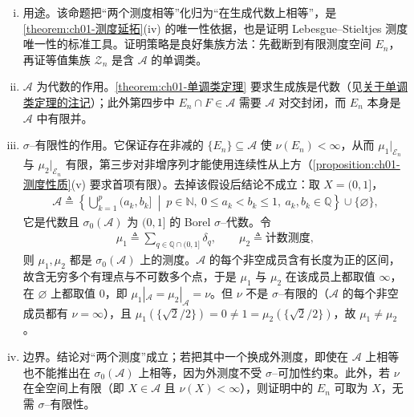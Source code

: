 \documentclass[../../main.tex]{subfiles}%
\begin{document}
\begin{remark}\label{remark:ch01-重合准则}
\begin{enumerate}[(i)]
\item 用途。该命题把“两个测度相等”化归为“在生成代数上相等”，是\cref{theorem:ch01-测度延拓}(iv) 的唯一性依据，也是证明 Lebesgue--Stieltjes 测度唯一性的标准工具。证明策略是良好集族方法：先截断到有限测度空间 $E_n$，再证等值集族 $\mathcal{Z}_n$ 是含 $\mathcal{A}$ 的单调类。
\item $\mathcal{A}$ 为代数的作用。\cref{theorem:ch01-单调类定理} 要求生成族是代数（见\hyperref[remark:ch01-单调类定理]{关于单调类定理的注记}）；此外第四步中 $E_n\cap F\in\mathcal{A}$ 需要 $\mathcal{A}$ 对交封闭，而 $E_n$ 本身是 $\mathcal{A}$ 中有限并。
\item $\sigma$--有限性的作用。它保证存在非减的 $\{E_n\}\subseteq\mathcal{A}$ 使 $\nu(E_n)<\infty$，从而 $\mu_1|_{\mathcal{E}_n}$ 与 $\mu_2|_{\mathcal{E}_n}$ 有限，第三步对非增序列才能使用连续性从上方（\cref{proposition:ch01-测度性质}(v) 要求首项有限）。去掉该假设后结论不成立：取 $X=(0,1]$，
\begin{align*}
\mathcal{A}\triangleq\left\{\bigcup_{k=1}^p(a_k,b_k]\ \middle|\ p\in\mathbb{N},\ 0\leqslant a_k<b_k\leqslant 1,\ a_k,b_k\in\mathbb{Q}\right\}\cup\{\varnothing\},
\end{align*}
它是代数且 $\sigma_0(\mathcal{A})$ 为 $(0,1]$ 的 Borel $\sigma$--代数。令
\begin{align*}
\mu_1\triangleq\sum_{q\in\mathbb{Q}\cap(0,1]}\delta_q,\qquad \mu_2\triangleq\text{计数测度},
\end{align*}
则 $\mu_1,\mu_2$ 都是 $\sigma_0(\mathcal{A})$ 上的测度。$\mathcal{A}$ 的每个非空成员含有长度为正的区间，故含无穷多个有理点与不可数多个点，于是 $\mu_1$ 与 $\mu_2$ 在该成员上都取值 $\infty$，在 $\varnothing$ 上都取值 $0$，即 $\mu_1|_{\mathcal{A}}=\mu_2|_{\mathcal{A}}=\nu$。但 $\nu$ 不是 $\sigma$--有限的（$\mathcal{A}$ 的每个非空成员都有 $\nu=\infty$），且 $\mu_1(\{\sqrt{2}/2\})=0\neq 1=\mu_2(\{\sqrt{2}/2\})$，故 $\mu_1\neq\mu_2$。
\item 边界。结论对“两个测度”成立；若把其中一个换成外测度，即使在 $\mathcal{A}$ 上相等也不能推出在 $\sigma_0(\mathcal{A})$ 上相等，因为外测度不受 $\sigma$--可加性约束。此外，若 $\nu$ 在全空间上有限（即 $X\in\mathcal{A}$ 且 $\nu(X)<\infty$），则证明中的 $E_n$ 可取为 $X$，无需 $\sigma$--有限性。
\end{enumerate}
\end{remark}
\end{document}
